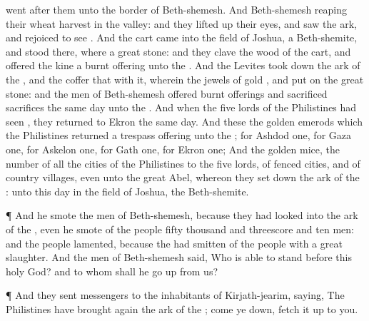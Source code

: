 {went
after them unto the
border of
Beth-shemesh.
And
{}
Beth-shemesh
{}
reaping their
wheat
harvest in the
valley: and they lifted
up their
eyes, and
saw the
ark, and
rejoiced to
see
{}.
And the
cart
came into the
field of
Joshua, a
Beth-shemite, and
stood there, where
{} a
great
stone: and they
clave the
wood of the
cart, and
offered the
kine a burnt
offering unto the
{}.
And the
Levites took
down the
ark of the
{}, and the
coffer that
{} with it, wherein the
jewels of
gold
{}, and
put
{} on the
great
stone: and the
men of
Beth-shemesh
offered burnt
offerings and
sacrificed
sacrifices the same
day unto the
{}.
And when the
five
lords of the
Philistines had
seen
{}, they
returned to
Ekron the same
day.
And these
{} the
golden
emerods which the
Philistines
returned
{} a trespass
offering unto the
{}; for
Ashdod
one, for
Gaza
one, for
Askelon
one, for
Gath
one, for
Ekron
one;
And the
golden
mice,
{} the
number of all the
cities of the
Philistines
{} to the
five
lords,
{} of
fenced
cities, and of
country
villages, even unto the
great
{}
Abel, whereon they set
down the
ark of the
{}:
{} unto this
day in the
field of
Joshua, the
Beth-shemite.
\par }{\PP {}¶ And he
smote the
men of
Beth-shemesh, because they had
looked into the
ark of the
{}, even he
smote of the
people
fifty
thousand and threescore and
ten
men: and the
people
lamented, because the
{} had
smitten
{} of the
people with a
great
slaughter.
And the
men of
Beth-shemesh
said, Who is
able to
stand
before this
holy
{}
God? and to whom shall he go
up from us?
\par }{\PP {}¶ And they
sent
messengers to the
inhabitants of
Kirjath-jearim,
saying, The
Philistines have brought
again the
ark of the
{}; come ye
down,
{} fetch it
up to you.

}
